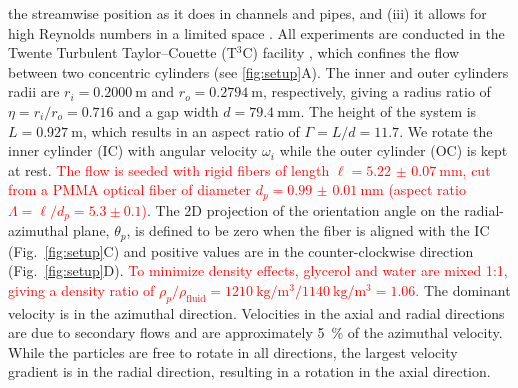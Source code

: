 \documentclass[aps, pre, onecolumn, superscriptaddress,longbibliography]{revtex4-1}
\newcommand{\makered}[1]{\textcolor{red}{#1}}
\begin{document}
the streamwise position as it does in channels and pipes, and (iii) it allows
for high Reynolds numbers in a limited space \cite{Grossmann2016}. %
%
All experiments are conducted in the Twente Turbulent Taylor--Couette (T$^3$C)
facility \cite{vanGils2011}, which confines the flow between two concentric
cylinders (see \ref{fig:setup}A).
The inner and outer cylinders radii are $r_i=\SI{0.2000}{\metre}$ and
$r_o=\SI{0.2794}{\metre}$, respectively, giving a radius ratio of
$\eta=r_i/r_o=0.716$ and a gap width $d=\SI{79.4}{\milli\metre}$. The height
of the system is $L=\SI{0.927}{\metre}$, which results in an aspect ratio of
$\Gamma=L/d=11.7$. We rotate the inner cylinder (IC) with angular velocity
$\omega_i$ while the outer cylinder (OC) is kept at rest. \makered{The flow is seeded with rigid fibers of length 
$\ell = \SI[separate-uncertainty =
true,multi-part-units=single]{5.22(7)}{\milli\metre}$,
cut from a PMMA optical fiber of diameter 
$d_p =\SI[separate-uncertainty = true,multi-part-units=single]{0.99(1)}{\milli\metre}$
(aspect ratio $\Lambda=\ell/d_p = 5.3\pm0.1$)}.
The 2D projection of the orientation angle on the
radial-azimuthal plane, $\theta_p$, is defined to be zero when the fiber is
aligned with the IC (Fig.~\ref{fig:setup}C) and positive values
are in the counter-clockwise direction (Fig.~\ref{fig:setup}D).
\makered{To minimize density effects, glycerol and water are mixed 1:1, giving a density ratio of $\rho_p/\rho_\text{fluid}=\SI{1210}{\kilo\gram\per\metre\cubed}/\SI{1140}{\kilo\gram\per\metre\cubed}=1.06$.}
The dominant velocity is in the azimuthal
direction. Velocities in the axial and radial directions are due to secondary
flows and are approximately \SI{5}{\percent} of the azimuthal velocity. While
the particles are free to rotate in all directions, the largest velocity
gradient is in the radial direction, resulting in a rotation in the axial
direction.%
\end{document}

